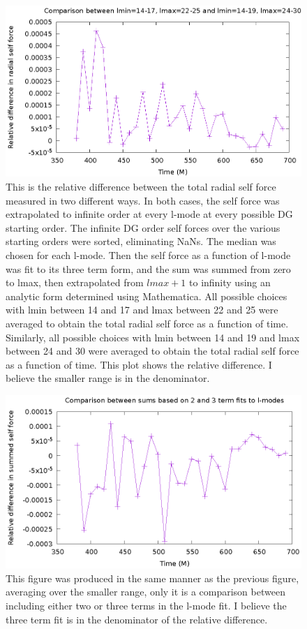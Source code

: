 \begin{figure}
  \includegraphics{relErrBigSmallRangeOverTime.eps}
  \caption{This is the relative difference between the total radial self force measured in two different ways. In both cases, the self force was extrapolated to infinite order at every l-mode at every possible DG starting order. The infinite DG order self forces over the various starting orders were sorted, eliminating NaNs. The median was chosen for each l-mode. Then the self force as a function of l-mode was fit to its three term form, and the sum was summed from zero to lmax, then extrapolated from $lmax +1 $ to infinity using an analytic form determined using Mathematica. All possible choices with lmin between 14 and 17 and lmax between 22 and 25 were averaged to obtain the total radial self force as a function of time. Similarly, all possible choices with lmin between 14 and 19 and lmax between 24 and 30 were averaged to obtain the total radial self force as a function of time. This plot shows the relative difference. I believe the smaller range is in the denominator.}
\end{figure}

\newpage

\begin{figure}
  \includegraphics{relativeError23termSelfForce.eps}
  \caption{This figure was produced in the same manner as the previous figure, averaging over the smaller range, only it is a comparison between including either two or three terms in the l-mode fit. I believe the three term fit is in the denominator of the relative difference.}
\end{figure}

